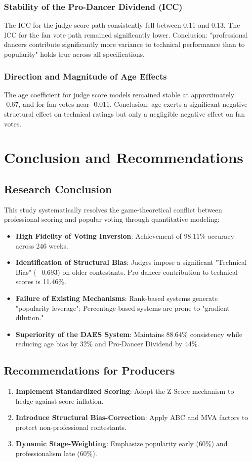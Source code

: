 \documentclass[12pt]{article}
\begin{document}
	\subsubsection{Stability of the Pro-Dancer Dividend (ICC)}
	The ICC for the judge score path consistently fell between 0.11 and 0.13. The ICC for the fan vote path remained significantly lower. Conclusion: "professional dancers contribute significantly more variance to technical performance than to popularity" holds true across all specifications.
	
	\subsubsection{Direction and Magnitude of Age Effects}
	The age coefficient for judge score models remained stable at approximately -0.67, and for fan votes near -0.011. Conclusion: age exerts a significant negative structural effect on technical ratings but only a negligible negative effect on fan votes.
	
	\section{Conclusion and Recommendations}
	\subsection{Research Conclusion}
	This study systematically resolves the game-theoretical conflict between professional scoring and popular voting through quantitative modeling:
	\begin{itemize}
		\item \textbf{High Fidelity of Voting Inversion}: Achievement of 98.11\% accuracy across 246 weeks.
		\item \textbf{Identification of Structural Bias}: Judges impose a significant "Technical Bias" ($-0.693$) on older contestants. Pro-dancer contribution to technical scores is 11.46\%.
		\item \textbf{Failure of Existing Mechanisms}: Rank-based systems generate "popularity leverage"; Percentage-based systems are prone to "gradient dilution."
		\item \textbf{Superiority of the DAES System}: Maintains 88.64\% consistency while reducing age bias by 32\% and Pro-Dancer Dividend by 44\%.
	\end{itemize}
	
	\subsection{Recommendations for Producers}
	\begin{enumerate}
		\item \textbf{Implement Standardized Scoring}: Adopt the Z-Score mechanism to hedge against score inflation.
		\item \textbf{Introduce Structural Bias-Correction}: Apply ABC and MVA factors to protect non-professional contestants.
		\item \textbf{Dynamic Stage-Weighting}: Emphasize popularity early (60\%) and professionalism late (60\%).
	\end{enumerate}
	
\end{document}
